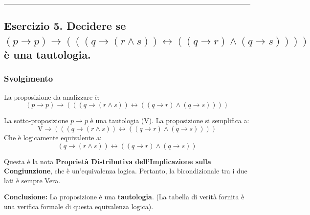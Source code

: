 \vspace{0.5cm}
\hrule
\vspace{0.5cm}

\subsection*{Esercizio 5. Decidere se $(p \to p) \to (((q \to (r \wedge s)) \leftrightarrow ((q \to r) \wedge (q \to s))))$ è una tautologia.}

\subsubsection*{Svolgimento}

La proposizione da analizzare è:
$$ (p \to p) \to (((q \to (r \wedge s)) \leftrightarrow ((q \to r) \wedge (q \to s)))) $$

La sotto-proposizione $p \to p$ è una tautologia ($\text{V}$). La proposizione si semplifica a:
$$ \text{V} \to (((q \to (r \wedge s)) \leftrightarrow ((q \to r) \wedge (q \to s)))) $$
Che è logicamente equivalente a:
$$ (q \to (r \wedge s)) \leftrightarrow ((q \to r) \wedge (q \to s)) $$

Questa è la nota \textbf{Proprietà Distributiva dell'Implicazione sulla Congiunzione}, che è un'equivalenza logica. Pertanto, la bicondizionale tra i due lati è sempre Vera.

\textbf{Conclusione:} La proposizione è una \textbf{tautologia}.
(La tabella di verità fornita è una verifica formale di questa equivalenza logica).


